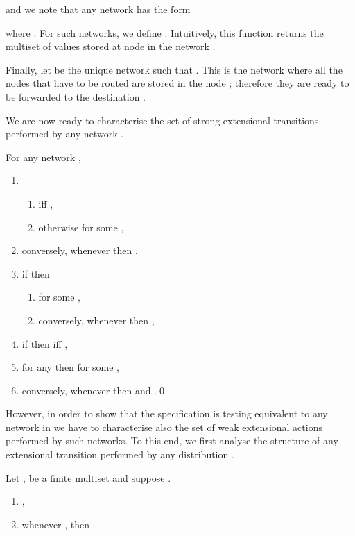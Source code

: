\documentclass{LMCS}
\begin{document}
\noindent
and we note that any network  has the form 

\noindent
where . 
For such networks, we define . 
Intuitively, this function returns the multiset of values stored at 
node  in the network .

Finally, let  be the unique 
network such that .
This is the network where all the nodes that have to be routed are 
stored in the node ; therefore they are ready to be forwarded to 
the destination .

We are now ready to characterise the set of strong extensional 
transitions performed by any network .

\begin{prop}
\label{prop:routing.impl.strong}
For any network , 
\begin{enumerate} 
\item 
\begin{enumerate}[label=(\roman*)]
\item  
iff , 
\item otherwise  for some 
, 
\end{enumerate}
\item conversely, whenever  
then ,
\item if  then 
\begin{enumerate}[label=(\roman*)]
\item  
for some , 
\item conversely, whenever  then 
, 
\end{enumerate}
\item if  then  iff 
,
\item for any  then 
 for some 
,
\item conversely, whenever  then  and 
.\qed
\end{enumerate}
\end{prop}

However, in order to show that the specification 
 is testing equivalent to any network 
in  we have to characterise 
also the set of weak extensional actions performed 
by such networks. To this end, we first analyse 
the structure of any -extensional transition performed 
by any distribution . 

\begin{prop}
\label{prop:stop.reachable}
Let ,  be a finite multiset and 
suppose . 
\begin{enumerate}
\item ,
\item whenever , then 
.
\end{enumerate}
\end{prop}
\end{document}
